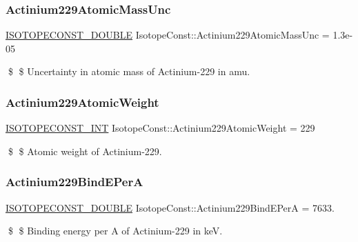\subsubsection{\texorpdfstring{Actinium229\+Atomic\+Mass\+Unc}{Actinium229AtomicMassUnc}}
{\footnotesize\ttfamily \mbox{\hyperlink{group___isotope_const-_macros_ga8f45a7272ce02c0b4c65c44636ed719a}{I\+S\+O\+T\+O\+P\+E\+C\+O\+N\+S\+T\+\_\+\+D\+O\+U\+B\+LE}} Isotope\+Const\+::\+Actinium229\+Atomic\+Mass\+Unc = 1.\+3e-\/05}

\$ \$ Uncertainty in atomic mass of Actinium-\/229 in amu. \mbox{\label{group___isotope_const-_actinium-_ac229_ga52e367a27c3e208dcb3d9790a1bf7ccb}} 
\subsubsection{\texorpdfstring{Actinium229\+Atomic\+Weight}{Actinium229AtomicWeight}}
{\footnotesize\ttfamily \mbox{\hyperlink{group___isotope_const-_macros_ga5f18360b3e99483a35c32d789e62621c}{I\+S\+O\+T\+O\+P\+E\+C\+O\+N\+S\+T\+\_\+\+I\+NT}} Isotope\+Const\+::\+Actinium229\+Atomic\+Weight = 229}

\$ \$ Atomic weight of Actinium-\/229. \mbox{\label{group___isotope_const-_actinium-_ac229_gac5c08b4adec3f89736bedc62319cc436}} 
\subsubsection{\texorpdfstring{Actinium229\+Bind\+E\+PerA}{Actinium229BindEPerA}}
{\footnotesize\ttfamily \mbox{\hyperlink{group___isotope_const-_macros_ga8f45a7272ce02c0b4c65c44636ed719a}{I\+S\+O\+T\+O\+P\+E\+C\+O\+N\+S\+T\+\_\+\+D\+O\+U\+B\+LE}} Isotope\+Const\+::\+Actinium229\+Bind\+E\+PerA = 7633.}

\$ \$ Binding energy per A of Actinium-\/229 in keV. \mbox{\label{group___isotope_const-_actinium-_ac229_ga6f0e4afdf78ebcfb572e1305afcd02a3}} 

